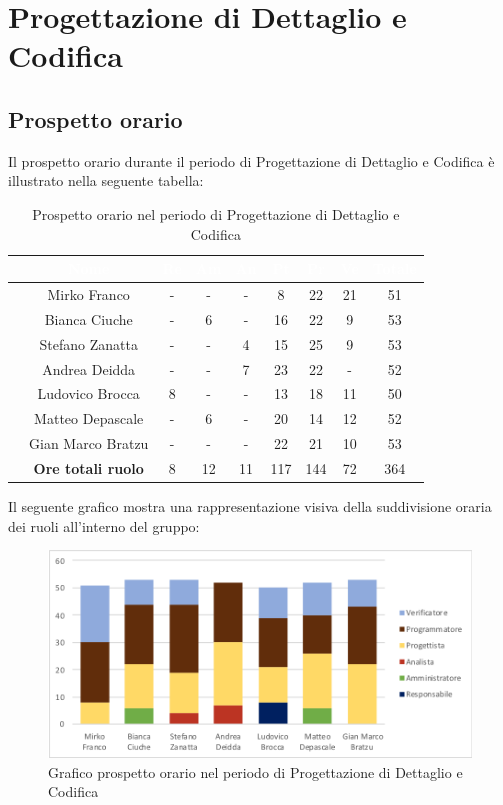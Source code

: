 \section{Progettazione di Dettaglio e Codifica}
\subsection{Prospetto orario}
Il prospetto orario durante il periodo di Progettazione di Dettaglio e Codifica è illustrato nella seguente tabella:

\begin{table}[ht]
	\begin{center}
		\begin{tabular}{ccccccccc}
			\rowcolor{coolblack}
			\hline
			& \textcolor{white}{Nome} & \textcolor{white}{Re} & \textcolor{white}{Am} & \textcolor{white}{An} & \textcolor{white}{Pt} &\textcolor{white}{Pr} & \textcolor{white}{Ve} & \textcolor{white}{Totale} \\
			\hline
			&Mirko Franco & - & - & - & 8 & 22 & 21 & 51  \\
			&Bianca Ciuche & -& 6& - & 16 & 22 & 9 & 53 \\
			&Stefano Zanatta & - & - & 4 & 15 & 25 & 9 & 53 \\
			&Andrea Deidda &  -& - & 7 & 23 & 22 & - & 52 \\
			&Ludovico Brocca & 8& - & - & 13 & 18 & 11 & 50 \\
			&Matteo Depascale & -& 6& - & 20 & 14 & 12 & 52 \\
			&Gian Marco Bratzu & -& - & - & 22 & 21 & 10 & 53 \\
			\hline
			&\textbf{Ore totali ruolo} & 8 & 12 & 11 & 117 & 144 & 72 & 364 \\
		\end{tabular}
	\caption{Prospetto orario nel periodo di Progettazione di Dettaglio e Codifica}
	\end{center}
\end{table}

Il seguente grafico mostra una rappresentazione visiva della suddivisione oraria dei ruoli all'interno del gruppo:
\begin{figure}[!ht]
	\begin{center}
		\includegraphics[scale=0.80]{images/grafoProgettazioneDettaglioCodifica.png}
		\caption{Grafico prospetto orario nel periodo di Progettazione di Dettaglio e Codifica}
	\end{center}
\end{figure}

